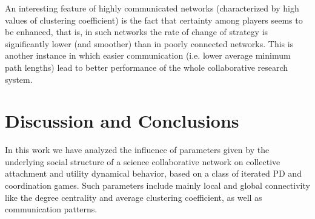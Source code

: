 \documentclass[11pt]{article}
\begin{document}
\FloatBarrier

An interesting feature of highly communicated networks (characterized by high values of clustering coefficient) is the
fact that certainty among players seems to be enhanced, that is, in such networks the rate of change of strategy is
significantly lower (and smoother) than in poorly connected networks. This is another instance in which easier
communication (i.e. lower average minimum path lengths) lead to better performance of the whole collaborative research
system.\\ 


\section{Discussion and Conclusions}
\label{sec:3}

{\color{red}In this work we have analyzed the influence of parameters given by the underlying social structure of a science
collaborative network on collective attachment and utility dynamical behavior, based on a class of iterated
PD and coordination games. Such parameters include mainly local and global connectivity like the degree centrality and
average clustering coefficient, as well as communication patterns.}\\
\end{document}
